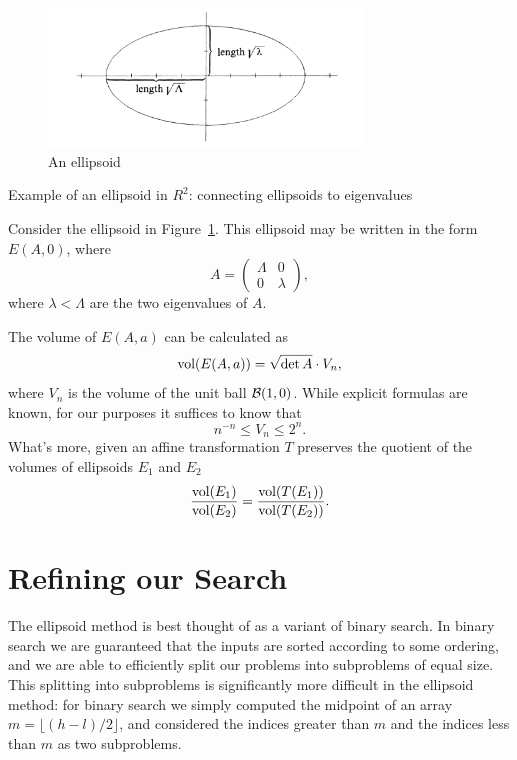\begin{figure}[t]
  \centering
  \includegraphics[width=0.75\textwidth]{img/ellipsoid}
  \caption{An ellipsoid}
  \label{fig:ellipsoid-eigenvalue}
\end{figure}
\begin{examplebox}{Example of an ellipsoid in \(R^2\): connecting ellipsoids to
  eigenvalues}
  \begin{example} Consider the ellipsoid in
    Figure~\ref{fig:ellipsoid-eigenvalue}. This ellipsoid may be written in the
    form \(E(A,0)\), where
    \[A = \left(\begin{matrix}
      \Lambda & 0\\
      0 & \lambda
    \end{matrix}\right),\]
    where \(\lambda < \Lambda\) are the two eigenvalues of \(A\).
  \end{example}
\end{examplebox}

\begin{fact}
  The volume of \(E(A,a)\) can be calculated as
  \[\textnormal{vol}(E(A, a)) = \sqrt{\det A} \cdot V_n,\]
  where \(V_n\) is the volume of the unit ball \(\mathcal{B}(1,0)\). While explicit
  formulas are known, for our purposes it suffices to know that
  \[n^{-n} \leq V_n \leq 2^n.\]
  What's more, given an affine transformation \(T\) preserves the quotient of
  the volumes of ellipsoids \(E_1\) and \(E_2\)
  \[\frac{\textnormal{vol}(E_1)}{\textnormal{vol}(E_2)} = \frac{\textnormal{vol}(T(E_1))}{\textnormal{vol}(T(E_2))}.\]
\end{fact}


\section{Refining our Search}
The ellipsoid method is best thought of as a variant of binary search.  In
binary search we are guaranteed that the inputs are sorted according to some
ordering, and we are able to efficiently split our problems into subproblems of
equal size. This splitting into subproblems is significantly more difficult in
the ellipsoid method: for binary search we simply computed the midpoint of an
array \(m = \lfloor (h - l) / 2 \rfloor\), and considered the indices greater
than \(m\) and the indices less than \(m\) as two subproblems.

